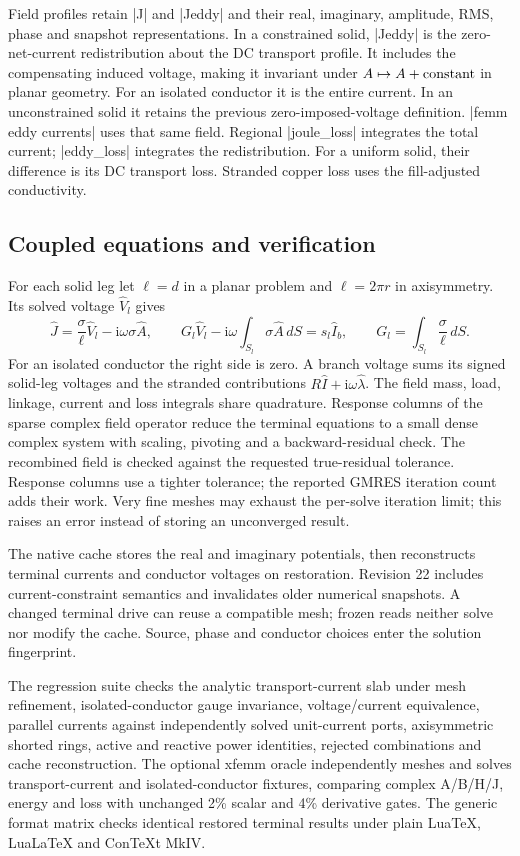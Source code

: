 Field profiles retain |J| and |Jeddy| and their real, imaginary, amplitude,
RMS, phase and snapshot representations. In a constrained solid,
|Jeddy| is the zero-net-current redistribution about the DC transport profile.
It includes the compensating induced voltage, making it invariant under
$A\mapsto A+\hbox{constant}$ in planar geometry. For an isolated conductor it
is the entire current. In an unconstrained solid it retains the previous
zero-imposed-voltage definition. |femm eddy currents| uses that same field.
Regional |joule_loss| integrates the total current; |eddy_loss| integrates the
redistribution. For a uniform solid, their difference is its DC transport
loss. Stranded copper loss uses the fill-adjusted conductivity.

\subsection{Coupled equations and verification}
For each solid leg let $\ell=d$ in a planar problem and $\ell=2\pi r$ in
axisymmetry. Its solved voltage $\widehat V_l$ gives
\[
 \widehat J=\frac{\sigma}{\ell}\widehat V_l
                 -\mathrm i\omega\sigma\widehat A,\qquad
 G_l\widehat V_l-\mathrm i\omega\int_{S_l}\sigma\widehat A\,dS
       =s_l\widehat I_b,\qquad
 G_l=\int_{S_l}\frac{\sigma}{\ell}\,dS.
\]
For an isolated conductor the right side is zero. A branch voltage sums its
signed solid-leg voltages and the stranded contributions
$R\widehat I+\mathrm i\omega\widehat\lambda$. The field mass, load, linkage,
current and loss integrals share quadrature. Response columns of the sparse
complex field operator reduce the terminal equations to a small dense complex
system with scaling, pivoting and a backward-residual check. The recombined
field is checked against the requested true-residual tolerance. Response columns
use a tighter tolerance; the reported GMRES iteration count adds their work.
Very fine meshes may exhaust the per-solve iteration limit; this raises an error
instead of storing an unconverged result.

The native cache stores the real and imaginary potentials, then reconstructs
terminal currents and conductor voltages on restoration. Revision 22 includes
current-constraint semantics and invalidates older numerical snapshots. A
changed terminal drive can reuse a compatible mesh; frozen reads neither solve
nor modify the cache. Source, phase and conductor choices enter the solution
fingerprint.

The regression suite checks the analytic transport-current slab under mesh
refinement, isolated-conductor gauge invariance, voltage/current equivalence,
parallel currents against independently solved unit-current ports, axisymmetric
shorted rings, active and reactive power identities, rejected combinations and
cache reconstruction. The optional xfemm oracle independently meshes and solves
transport-current and isolated-conductor fixtures, comparing complex A/B/H/J,
energy and loss with unchanged 2\% scalar and 4\% derivative gates. The generic format matrix checks identical restored
terminal results under plain LuaTeX, LuaLaTeX and ConTeXt MkIV.


